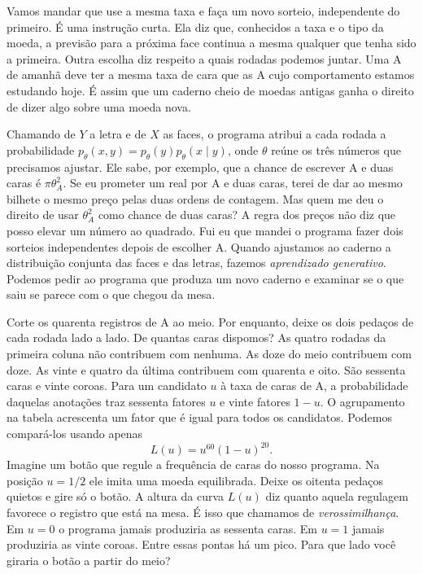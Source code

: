 Vamos mandar que use a mesma taxa e faça um novo sorteio, independente do primeiro. É uma instrução curta. Ela diz que, conhecidos a taxa e o tipo da moeda, a previsão para a próxima face continua a mesma qualquer que tenha sido a primeira. Outra escolha diz respeito a quais rodadas podemos juntar. Uma A de amanhã deve ter a mesma taxa de cara que as A cujo comportamento estamos estudando hoje. É assim que um caderno cheio de moedas antigas ganha o direito de dizer algo sobre uma moeda nova.

Chamando de $Y$ a letra e de $X$ as faces, o programa atribui a cada rodada a probabilidade $p_\theta(x,y)=p_\theta(y)p_\theta(x\mid y)$, onde $\theta$ reúne os três números que precisamos ajustar. Ele sabe, por exemplo, que a chance de escrever A e duas caras é $\pi\theta_A^2$. Se eu prometer um real por A e duas caras, terei de dar ao mesmo bilhete o mesmo preço pelas duas ordens de contagem. Mas quem me deu o direito de usar $\theta_A^2$ como chance de duas caras? A regra dos preços não diz que posso elevar um número ao quadrado. Fui eu que mandei o programa fazer dois sorteios independentes depois de escolher A. Quando ajustamos ao caderno a distribuição conjunta das faces e das letras, fazemos \emph{aprendizado generativo}. Podemos pedir ao programa que produza um novo caderno e examinar se o que saiu se parece com o que chegou da mesa.

Corte os quarenta registros de A ao meio. Por enquanto, deixe os dois pedaços de cada rodada lado a lado. De quantas caras dispomos? As quatro rodadas da primeira coluna não contribuem com nenhuma. As doze do meio contribuem com doze. As vinte e quatro da última contribuem com quarenta e oito. São sessenta caras e vinte coroas. Para um candidato $u$ à taxa de caras de A, a probabilidade daquelas anotações traz sessenta fatores $u$ e vinte fatores $1-u$. O agrupamento na tabela acrescenta um fator que é igual para todos os candidatos. Podemos compará-los usando apenas
\[
                         L(u)=u^{60}(1-u)^{20}.
\]
Imagine um botão que regule a frequência de caras do nosso programa. Na posição $u=1/2$ ele imita uma moeda equilibrada. Deixe os oitenta pedaços quietos e gire só o botão. A altura da curva $L(u)$ diz quanto aquela regulagem favorece o registro que está na mesa. É isso que chamamos de \emph{verossimilhança}. Em $u=0$ o programa jamais produziria as sessenta caras. Em $u=1$ jamais produziria as vinte coroas. Entre essas pontas há um pico. Para que lado você giraria o botão a partir do meio?

